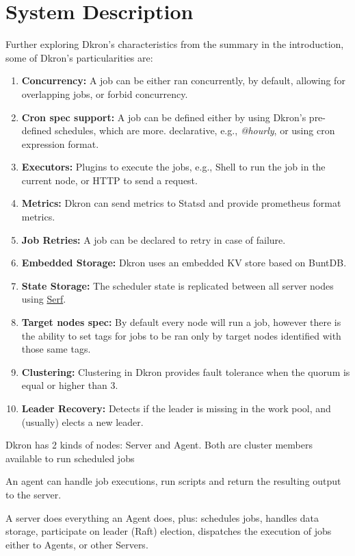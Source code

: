 \documentclass[runningheads]{llncs}
\begin{document}
\section{System Description}
\label{system_description}

Further exploring Dkron's characteristics from the summary in the introduction, some of Dkron's particularities are:
\begin{enumerate}
    \item \textbf{Concurrency:} A job can be either ran concurrently, by default,
    allowing for overlapping jobs, or forbid concurrency.
    \item \textbf{Cron spec support:} A job can be defined either by using Dkron's
    pre-defined schedules, which are more.
    declarative, e.g., \textit{@hourly}, or using cron expression format.
    \item \textbf{Executors:} Plugins to execute the jobs, e.g., Shell to run the job in
    the current node, or HTTP to send a request.
    \item \textbf{Metrics:} Dkron can send metrics to Statsd and provide prometheus format metrics.
    \item \textbf{Job Retries:} A job can be declared to retry in case of failure.
    \item \textbf{Embedded Storage:} Dkron uses an embedded KV store based on BuntDB.
    \item \textbf{State Storage:} The scheduler state is replicated between all
    server nodes using \href{https://www.serf.io/}{Serf}.
    \item \textbf{Target nodes spec:} By default every node will run a job, however there is
    the ability to set tags for jobs to be ran only by target nodes identified with those
    same tags.
    \item \textbf{Clustering:} Clustering in Dkron provides fault tolerance when the
    quorum is equal or higher than 3.
    \item \textbf{Leader Recovery:} Detects if the leader is missing in the work pool,
    and (usually) elects a new leader.
\end{enumerate}


Dkron has 2 kinds of nodes: Server and Agent.
Both are cluster members available to run scheduled jobs

An agent can handle job executions, run scripts and return the resulting output to the server.

A server does everything an Agent does, plus: schedules jobs, handles data storage,
participate on leader (Raft) election, dispatches the execution of jobs either to Agents,
or other Servers.
\end{document}
